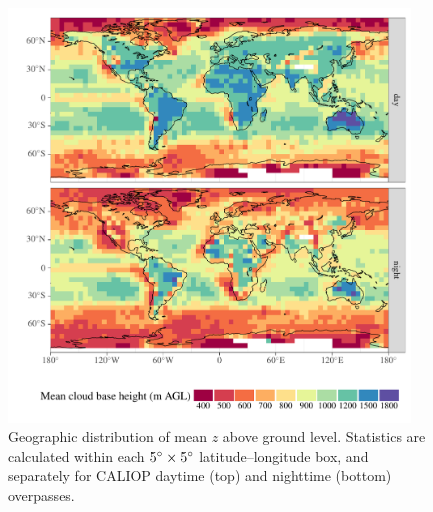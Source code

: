 \documentclass[essd,manuscript]{copernicus}\usepackage[]{graphicx}\usepackage[]{color}
\newenvironment{knitrout}{}{} %
\newcommand\CBH{\ensuremath{z}}
\begin{document}
\begin{figure}
  \centering
\begin{knitrout}
\color{fgcolor}

{\centering \includegraphics[width=0.95\textwidth]{figure/method-cbase-base-1} 

}



\end{knitrout}
  \caption{Geographic distribution of mean \CBH{} above ground
    level.  Statistics are calculated within each $5^{\circ}\times 5^{\circ}$
    latitude--longitude box, and separately for CALIOP daytime (top) and
  nighttime (bottom)
    overpasses.}
  \label{fig:geo}
\end{figure}

\end{document}
